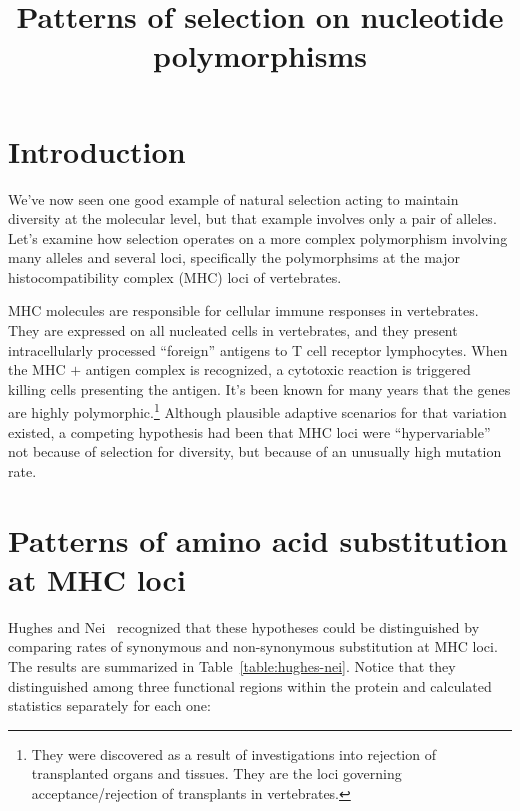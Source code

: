 \documentclass[12pt]{article}
\title{Patterns of selection on nucleotide polymorphisms}
\begin{document}
\maketitle

\thispagestyle{first}

\section*{Introduction}

We've now seen one good example of natural selection acting to
maintain diversity at the molecular level, but that example involves
only a pair of alleles. Let's examine how selection operates on a more
complex polymorphism involving many alleles and several loci,
specifically the polymorphsims at the major histocompatibility complex
(MHC) loci of vertebrates.

MHC molecules are responsible for cellular immune responses in
vertebrates. They are expressed on all nucleated cells in vertebrates,
and they present intracellularly processed ``foreign'' antigens to T
cell receptor lymphocytes. When the MHC $+$ antigen complex is
recognized, a cytotoxic reaction is triggered killing cells presenting
the antigen. It's been known for many years that the genes are highly
polymorphic.\footnote{They were discovered as a result of
  investigations into rejection of transplanted organs and
  tissues. They are the loci governing acceptance/rejection of
  transplants in vertebrates.} Although plausible adaptive scenarios
for that variation existed, a competing hypothesis had been that MHC
loci were ``hypervariable'' not because of selection for diversity,
but because of an unusually high mutation rate.

\section*{Patterns of amino acid substitution at MHC loci}

Hughes and Nei~\cite{Hughes-Nei88} recognized that these hypotheses
could be distinguished by comparing rates of synonymous and
non-synonymous substitution at MHC loci. The results are summarized
in Table~\ref{table:hughes-nei}. Notice that they distinguished among
three functional regions within the protein and calculated statistics
separately for each one:
\end{document}
